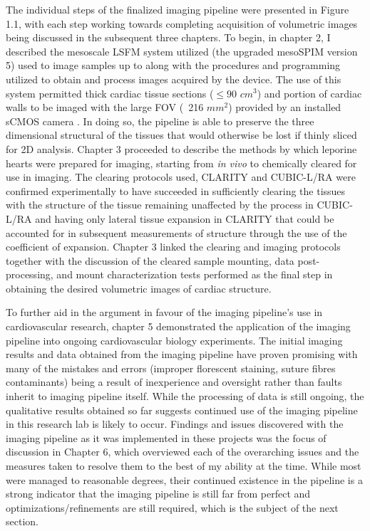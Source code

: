 The individual steps of the finalized imaging pipeline were presented in Figure 1.1, with each step working towards completing acquisition of volumetric images being discussed in the subsequent three chapters. To begin, in chapter 2, I described the mesoscale LSFM system utilized (the upgraded mesoSPIM version 5) used to image samples up to along with the procedures and programming utilized to obtain and process images acquired by the device. The use of this system permitted thick cardiac tissue sections ($\leq90$ $cm^3$) and portion of cardiac walls to be imaged with the large FOV (~216 $mm^2$) provided by an installed sCMOS camera \cite{voigt_mesospim_2019}. In doing so, the pipeline is able to preserve the three dimensional structural of the tissues that would otherwise be lost if thinly sliced for 2D analysis. Chapter 3 proceeded to describe the methods by which leporine hearts were prepared for imaging, starting from \textit{in vivo} to chemically cleared for use in imaging. The clearing protocols used, CLARITY and CUBIC-L/RA were confirmed experimentally to have succeeded in sufficiently clearing the tissues with the structure of the tissue remaining unaffected by the process in CUBIC-L/RA and having only lateral tissue expansion in CLARITY that could be accounted for in subsequent measurements of structure through the use of the coefficient of expansion. Chapter 3 linked the clearing and imaging protocols together with the discussion of the cleared sample mounting, data post-processing, and mount characterization tests performed as the final step in obtaining the desired volumetric images of cardiac structure. 

To further aid in the argument in favour of the imaging pipeline's use in cardiovascular research, chapter 5 demonstrated the application of the imaging pipeline into ongoing cardiovascular biology experiments. The initial imaging results and data obtained from the imaging pipeline have proven promising with many of the mistakes and errors (improper florescent staining, suture fibres contaminants) being a result of inexperience and oversight  rather than faults inherit to imaging pipeline itself. While the processing of data is still ongoing, the qualitative results obtained so far suggests continued use of the imaging pipeline in this research lab is likely to occur. Findings and issues discovered with the imaging pipeline as it was implemented in these projects was the focus of discussion in Chapter 6, which overviewed each of the overarching issues and the measures taken to resolve them to the best of my ability at the time. While most were managed to reasonable degrees, their continued existence in the pipeline is a strong indicator that the imaging pipeline is still far from perfect and optimizations/refinements are still required, which is the subject of the next section.


